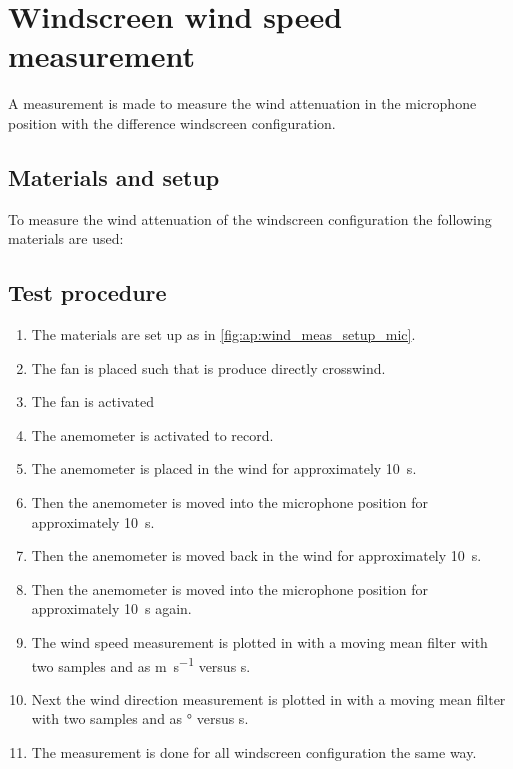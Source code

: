 \chapter{Windscreen wind speed measurement}\label{ap:wind_speed_att_first}
A measurement is made to measure the wind attenuation in the microphone position with the difference windscreen configuration.


\section*{Materials and setup}
To measure the wind attenuation of the windscreen configuration the following materials are used:

\startequipment
{}
\stopequipment




\section*{Test procedure}


\begin{enumerate}
\item The materials are set up as in \autoref{fig:ap:wind_meas_setup_mic}.
\item The fan is placed such that is produce directly crosswind.
\item The fan is activated 
\item The anemometer is activated to record.
\item The anemometer is placed in the wind for approximately \SI{10}{\second}.
\item Then the anemometer is moved into the microphone position for approximately \SI{10}{\second}.
\item Then the anemometer is moved back in the wind for approximately \SI{10}{\second}.
\item Then the anemometer is moved into the microphone position for approximately \SI{10}{\second} again. 
\item The wind speed measurement is plotted in \matlab with a moving mean filter with two samples and as \si{\meter\per\second} versus \si{\second}.
\item Next the wind direction measurement is plotted in \matlab with a moving mean filter with two samples and as \si{\degree} versus \si{\second}.
\item The measurement is done for all windscreen configuration the same way.
\end{enumerate}


